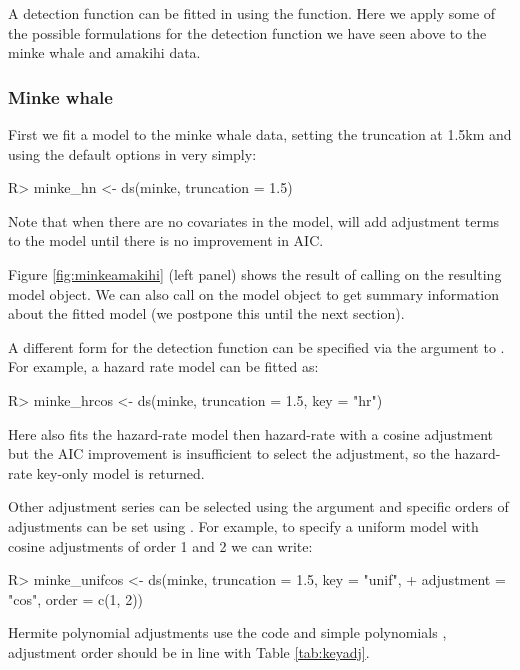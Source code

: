 \documentclass[article]{jss}
\begin{document}
A detection function can be fitted in  using the  function. Here we apply some of the possible formulations for the detection function we have seen above to the minke whale and amakihi data.

\subsubsection{Minke whale}

First we fit a model to the minke whale data, setting the truncation at 1.5km and using the default options in  very simply:
\begin{Schunk}
\begin{Sinput}
R> minke_hn <- ds(minke, truncation = 1.5)
\end{Sinput}
\end{Schunk}
Note that when there are no covariates in the model,  will add adjustment terms to the model until there is no improvement in AIC.

Figure \ref{fig:minkeamakihi} (left panel) shows the result of calling  on the resulting model object. We can also call  on the model object to get summary information about the fitted model (we postpone this until the next section).

A different form for the detection function can be specified via the  argument to . For example, a hazard rate model can be fitted as:
\begin{Schunk}
\begin{Sinput}
R> minke_hrcos <- ds(minke, truncation = 1.5, key = "hr")
\end{Sinput}
\end{Schunk}
Here  also fits the hazard-rate model then hazard-rate with a cosine adjustment but the AIC improvement is insufficient to select the adjustment, so the hazard-rate key-only model is returned.

Other adjustment series can be selected using the  argument and specific orders of adjustments can be set using . For example, to specify a uniform model with cosine adjustments of order 1 and 2 we can write:
\begin{Schunk}
\begin{Sinput}
R> minke_unifcos <- ds(minke, truncation = 1.5, key = "unif",
+                     adjustment = "cos", order = c(1, 2))
\end{Sinput}
\end{Schunk}
Hermite polynomial adjustments use the code  and simple polynomials , adjustment order should be in line with Table \ref{tab:keyadj}.
\end{document}
